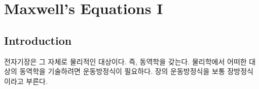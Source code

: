 \section{Maxwell's Equations I}
\label{sec:06a-01}

\subsection{Introduction}
전자기장은 그 자체로 물리적인 대상이다. 즉, 동역학을 갖는다. 물리학에서 어떠한 대상의 동역학을 기술하려면 운동방정식이 필요하다. 장의 운동방정식을 보통 장방정식이라고 부른다.
